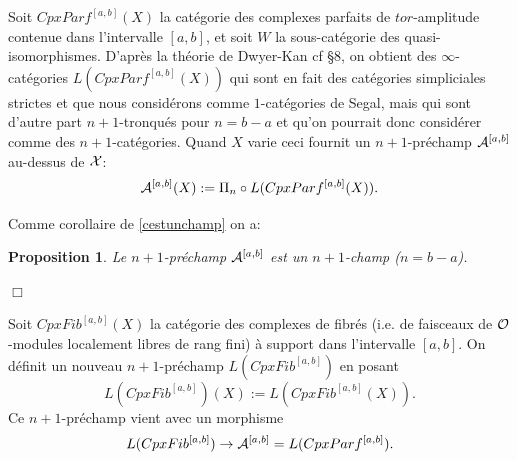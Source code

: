 \documentclass[12pt]{article}
\newcommand{\eop}{\hfill $\Box$\vspace{.1in}}
\newtheorem{proposition}[lemma]{Proposition}
\newcommand{\Oo}{{\cal O}}
\newcommand{\Xx}{{\cal X}}
\begin{document}
Soit $CpxParf^{[a,b]}(X)$ la cat\'egorie des complexes parfaits de
$tor$-amplitude contenue dans l'intervalle $[a,b]$, et soit $W$ la
sous-cat\'egorie des quasi-isomorphismes. D'apr\`es la th\'eorie de Dwyer-Kan
\cite{DwyerKan3} cf \S 8, on obtient des $\infty$-cat\'egories
$L( CpxParf^{[a,b]}(X))$
qui sont en fait des
cat\'egories simpliciales strictes et que nous consid\'erons comme
$1$-cat\'egories de Segal, mais qui sont d'autre part $n+1$-tronqu\'es pour
$n=b-a$ et qu'on pourrait donc consid\'erer comme des $n+1$-cat\'egories. Quand
$X$ varie ceci fournit un $n+1$-pr\'echamp ${\cal A}^{[a,b]}$
au-dessus de $\Xx$:
$$
{\cal A}^{[a,b]} (X):= \Pi _n \circ L( CpxParf^{[a,b]}(X)).
$$

Comme corollaire de \ref{cestunchamp} on a:

\begin{proposition}
\label{intro1}
Le $n+1$-pr\'echamp ${\cal  A}^{[a,b]}$ est un $n+1$-champ ($n=b-a$).
\end{proposition}
\eop

Soit $CpxFib^{[a,b]}(X)$ la cat\'egorie des complexes de fibr\'es
(i.e. de faisceaux de $\Oo$-modules localement libres de rang fini) \`a support
dans l'intervalle $[a,b]$. On d\'efinit un nouveau $n+1$-pr\'echamp
$L(CpxFib^{[a,b]})$ en posant
$$
L(CpxFib^{[a,b]})(X):= L(CpxFib^{[a,b]}(X)).
$$
Ce $n+1$-pr\'echamp vient avec un morphisme
$$
L(CpxFib^{[a,b]})\rightarrow {\cal  A}^{[a,b]}=L(CpxParf^{[a,b]}).
$$
\end{document}
